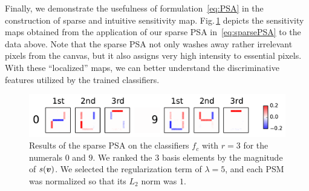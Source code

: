 Finally, we demonstrate the usefulness of formulation~\eqref{eq:PSA} in
the construction of sparse and intuitive sensitivity map.
%
Fig.\,\ref{fig:spsm_digit} depicts the sensitivity maps obtained from the
application of our sparse PSA in~\eqref{eq:sparsePSA} to the data above.
%
Note that the sparse PSA not only washes away rather irrelevant
pixels from the canvas, but it also assigns very high intensity to essential pixels.
%
With these ``localized'' maps, we can better understand the discriminative features
utilized by the trained classifiers.
\begin{figure}[htbp]
 \centering
 \includegraphics[width=0.8\columnwidth]{./fig/fig4.pdf}
 \caption{
 Results of the sparse PSA on the classifiers $f_c$ with $r =
 3$ for the numerals $0$ and $9$.
 We ranked the $3$ basis elements by the magnitude of $s(\mbox{\boldmath $v$})$.
 We selected the regularization term of  $\lambda = 5$,
 and each PSM was normalized so that its $L_2$ norm was $1$.
 }
 \label{fig:spsm_digit}
\end{figure}

